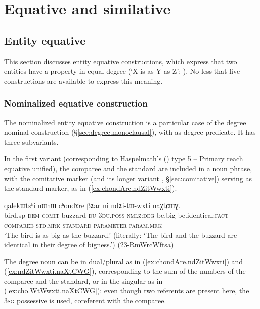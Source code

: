 \section{Equative and similative}


\subsection{Entity equative} \label{sec:equative}
This section discusses entity equative constructions, which express that two entities have a property in equal degree (`X is as Y as Z'; \citealt{haspelmath08equative}). No less that five constructions are available to express this meaning.

\subsubsection{Nominalized equative construction} \label{sec:nmlz.equative}
The nominalized entity equative construction is a particular case of the degree nominal construction (§\ref{sec:degree.monoclausal}), with  as degree predicate. It has three subvariants.

In the first variant (corresponding to Haspelmath's (\citeyear{haspelmath17equative}) type 5 -- Primary reach equative unified), the comparee and the standard are included in a noun phrase, with the comitative marker  (and its longer variant , §\ref{sec:comitative}) serving as the standard marker, as in (\ref{ex:chondAre.ndZitWwxti}).

\begin{exe}
\ex \label{ex:chondAre.ndZitWwxti}
\glll qalekɯtsʰi nɯnɯ cʰondɤre βʑar ni ndʑi-tɯ-wxti \phantom{espace}     naχtɕɯɣ.\\
bird.sp \textsc{dem} \textsc{comit} buzzard \textsc{du} \textsc{3du}.\textsc{poss}-\textsc{nmlz}:\textsc{deg}-be.big \phantom{espace} be.identical:\textsc{fact} \\
{\textsc{comparee}} { } \textsc{std}.\textsc{mrk} {\textsc{standard}} { } \textsc{parameter} \phantom{espace} \textsc{param}.\textsc{mrk} \\
\glt `The  bird is as big as the buzzard.' (literally: `The  bird and the buzzard are identical in their degree of bigness.')  (23-RmWrcWftsa)
\end{exe}

The degree noun can be in dual/plural as in (\ref{ex:chondAre.ndZitWwxti}) and (\ref{ex:ndZitWwxti.naXtCWG}), corresponding to the sum of the numbers of the comparee and the standard, or in the  singular as in (\ref{ex:cho.WtWwxti.naXtCWG}): even though two referents are present here, the \textsc{3sg} possessive  is used, coreferent with the comparee. 

